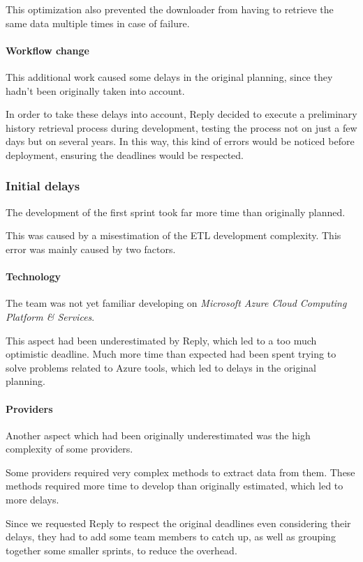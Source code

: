         This optimization also prevented the downloader from having to retrieve the same data multiple times in case of failure.
    
    \paragraph{Workflow change}
        This additional work caused some delays in the original planning, since they hadn't been originally taken into account.
        
        In order to take these delays into account, Reply decided to execute a preliminary history retrieval process during development, testing the process not on just a few days but on several years.
        In this way, this kind of errors would be noticed before deployment, ensuring the deadlines would be respected.
        
\subsubsection{Initial delays}
    The development of the first sprint took far more time than originally planned.
    
    This was caused by a misestimation of the ETL development complexity.
    This error was mainly caused by two factors.

    \paragraph{Technology}
        The team was not yet familiar developing on \textit{Microsoft Azure Cloud Computing Platform \& Services}.
        
        This aspect had been underestimated by Reply, which led to a too much optimistic deadline.
        Much more time than expected had been spent trying to solve problems related to Azure tools, which led to delays in the original planning.
        
    \paragraph{Providers}
        Another aspect which had been originally underestimated was the high complexity of some providers.
        
        Some providers required very complex methods to extract data from them.
        These methods required more time to develop than originally estimated, which led to more delays.\newline
    
    Since we requested Reply to respect the original deadlines even considering their delays, they had to add some team members to catch up, as well as grouping together some smaller sprints, to reduce the overhead.
    
